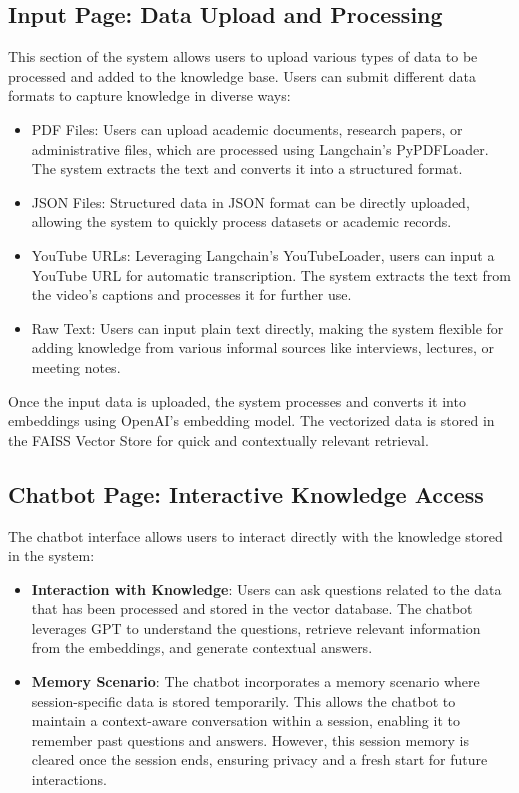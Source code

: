 \documentclass[runningheads]{llncs}
\begin{document}
\subsection{Input Page: Data Upload and Processing}
This section of the system allows users to upload various types of data to be processed and added to the knowledge base. Users can submit different data formats to capture knowledge in diverse ways:
\begin{itemize}
    \item PDF Files: Users can upload academic documents, research papers, or administrative files, which are processed using Langchain's PyPDFLoader. The system extracts the text and converts it into a structured format.
    \item JSON Files: Structured data in JSON format can be directly uploaded, allowing the system to quickly process datasets or academic records.
    \item YouTube URLs: Leveraging Langchain's YouTubeLoader, users can input a YouTube URL for automatic transcription. The system extracts the text from the video’s captions and processes it for further use.
    \item Raw Text: Users can input plain text directly, making the system flexible for adding knowledge from various informal sources like interviews, lectures, or meeting notes.
\end{itemize}

Once the input data is uploaded, the system processes and converts it into embeddings using OpenAI’s embedding model. The vectorized data is stored in the FAISS Vector Store for quick and contextually relevant retrieval.

\subsection{Chatbot Page: Interactive Knowledge Access}
The chatbot interface allows users to interact directly with the knowledge stored in the system:
\begin{itemize}
    \item \textbf{Interaction with Knowledge}: Users can ask questions related to the data that has been processed and stored in the vector database. The chatbot leverages GPT to understand the questions, retrieve relevant information from the embeddings, and generate contextual answers.
    \item \textbf{Memory Scenario}: The chatbot incorporates a memory scenario where session-specific data is stored temporarily. This allows the chatbot to maintain a context-aware conversation within a session, enabling it to remember past questions and answers. However, this session memory is cleared once the session ends, ensuring privacy and a fresh start for future interactions.
\end{itemize}
\end{document}

